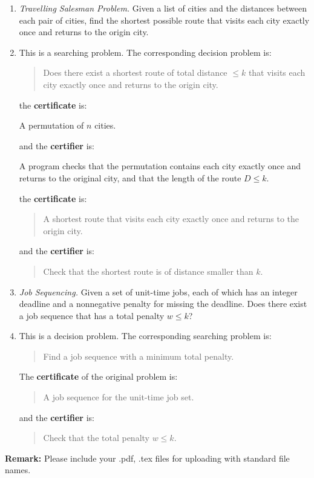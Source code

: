 \documentclass[12pt,a4paper]{article}
\makeatletter
\newtheorem*{solution}{Solution}
\theoremstyle{definition}
\renewenvironment{solution}[1][Solution] {\par\pushQED{\qed}\normalfont\topsep6\p@\@plus6\p@\relax\trivlist\item[\hskip\labelsep\bfseries#1\@addpunct{.}]\ignorespaces}{\popQED\endtrivlist\@endpefalse} \makeatother
\makeatother
\begin{document}
\begin{enumerate}
\begin{enumerate}
	    \item 
	    \textit{Travelling Salesman Problem.} Given a list of cities and the distances between each pair of cities, find the shortest possible route that visits each city exactly once and returns to the origin city.

		\begin{solution}
			This is a searching problem. The corresponding decision problem is:
			\begin{quotation}
				Does there exist a shortest route of total distance $\leq k$ that visits each city exactly once and returns to the origin city.
			\end{quotation}
			the \textbf{certificate} is:

		A permutation of $n$ cities.
		
		and the \textbf{certifier} is:

		A program checks that the permutation contains each city exactly once and returns to the original city, and that the length of the route $D\leq k$.
			\begin{tcolorbox}[skin=mycross]
			the \textbf{certificate} is:
			\begin{quotation}
				A shortest route that visits each city exactly once and returns to the origin city.
			\end{quotation} 
			and the \textbf{certifier} is:
			\begin{quotation}
				Check that the shortest route is of distance smaller than $k$.
			\end{quotation}
		\end{tcolorbox}
		
		\end{solution}
	    
	    \item
	    \textit{Job Sequencing.} Given a set of unit-time jobs, each of which has an integer deadline and a nonnegative penalty for missing the deadline. Does there exist a job sequence that has a total penalty $w\leqslant k$?
	    
		\begin{solution}
			This is a decision problem. The corresponding searching problem is:
			\begin{quotation}
				Find a job sequence with a minimum total penalty.
			\end{quotation}
			The \textbf{certificate} of the original problem is:
			\begin{quotation}
				A job sequence for the unit-time job set.
			\end{quotation}
			and the \textbf{certifier} is:
			\begin{quotation}
				Check that the total penalty $w\leq k$.
			\end{quotation}
		\end{solution}

	\end{enumerate}
\end{enumerate}

\textbf{Remark:} Please include your .pdf, .tex files for uploading with standard file names.
\newpage


\end{document}
